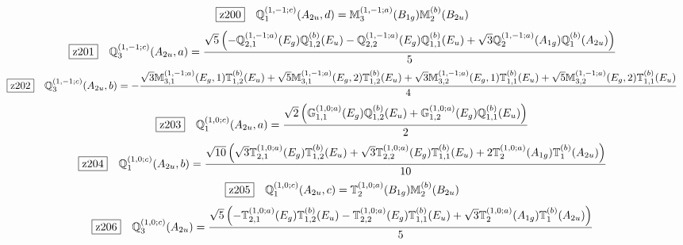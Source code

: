 \documentclass[fleqn,10pt,landscape]{jsarticle}
\begin{document}
\begin{dmath*}
\hspace*{3mm}\fbox{z200}\quad \mathbb{Q}_{1}^{(1,-1;c)}(A_{2u},d)=\mathbb{M}_{3}^{(1,-1;a)}(B_{1g}) \mathbb{M}_{2}^{(b)}(B_{2u})
\end{dmath*}
\begin{dmath*}
\hspace*{3mm}\fbox{z201}\quad \mathbb{Q}_{3}^{(1,-1;c)}(A_{2u},a)=\frac{\sqrt{5} \left(- \mathbb{Q}_{2,1}^{(1,-1;a)}(E_{g}) \mathbb{Q}_{1,2}^{(b)}(E_{u}) - \mathbb{Q}_{2,2}^{(1,-1;a)}(E_{g}) \mathbb{Q}_{1,1}^{(b)}(E_{u}) + \sqrt{3} \mathbb{Q}_{2}^{(1,-1;a)}(A_{1g}) \mathbb{Q}_{1}^{(b)}(A_{2u})\right)}{5}
\end{dmath*}
\begin{dmath*}
\hspace*{3mm}\fbox{z202}\quad \mathbb{Q}_{3}^{(1,-1;c)}(A_{2u},b)=- \frac{\sqrt{3} \mathbb{M}_{3,1}^{(1,-1;a)}(E_{g},1) \mathbb{T}_{1,2}^{(b)}(E_{u}) + \sqrt{5} \mathbb{M}_{3,1}^{(1,-1;a)}(E_{g},2) \mathbb{T}_{1,2}^{(b)}(E_{u}) + \sqrt{3} \mathbb{M}_{3,2}^{(1,-1;a)}(E_{g},1) \mathbb{T}_{1,1}^{(b)}(E_{u}) + \sqrt{5} \mathbb{M}_{3,2}^{(1,-1;a)}(E_{g},2) \mathbb{T}_{1,1}^{(b)}(E_{u})}{4}
\end{dmath*}
\begin{dmath*}
\hspace*{3mm}\fbox{z203}\quad \mathbb{Q}_{1}^{(1,0;c)}(A_{2u},a)=\frac{\sqrt{2} \left(\mathbb{G}_{1,1}^{(1,0;a)}(E_{g}) \mathbb{Q}_{1,2}^{(b)}(E_{u}) + \mathbb{G}_{1,2}^{(1,0;a)}(E_{g}) \mathbb{Q}_{1,1}^{(b)}(E_{u})\right)}{2}
\end{dmath*}
\begin{dmath*}
\hspace*{3mm}\fbox{z204}\quad \mathbb{Q}_{1}^{(1,0;c)}(A_{2u},b)=\frac{\sqrt{10} \left(\sqrt{3} \mathbb{T}_{2,1}^{(1,0;a)}(E_{g}) \mathbb{T}_{1,2}^{(b)}(E_{u}) + \sqrt{3} \mathbb{T}_{2,2}^{(1,0;a)}(E_{g}) \mathbb{T}_{1,1}^{(b)}(E_{u}) + 2 \mathbb{T}_{2}^{(1,0;a)}(A_{1g}) \mathbb{T}_{1}^{(b)}(A_{2u})\right)}{10}
\end{dmath*}
\begin{dmath*}
\hspace*{3mm}\fbox{z205}\quad \mathbb{Q}_{1}^{(1,0;c)}(A_{2u},c)=\mathbb{T}_{2}^{(1,0;a)}(B_{1g}) \mathbb{M}_{2}^{(b)}(B_{2u})
\end{dmath*}
\begin{dmath*}
\hspace*{3mm}\fbox{z206}\quad \mathbb{Q}_{3}^{(1,0;c)}(A_{2u})=\frac{\sqrt{5} \left(- \mathbb{T}_{2,1}^{(1,0;a)}(E_{g}) \mathbb{T}_{1,2}^{(b)}(E_{u}) - \mathbb{T}_{2,2}^{(1,0;a)}(E_{g}) \mathbb{T}_{1,1}^{(b)}(E_{u}) + \sqrt{3} \mathbb{T}_{2}^{(1,0;a)}(A_{1g}) \mathbb{T}_{1}^{(b)}(A_{2u})\right)}{5}
\end{dmath*}
\end{document}
